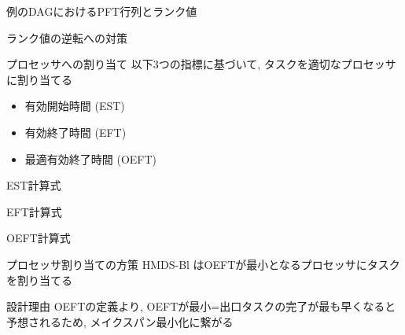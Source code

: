 \begin{frame}{例のDAGにおけるPFT行列とランク値}
\end{frame}

\begin{frame}{ランク値の逆転への対策}
\end{frame}

\begin{frame}{プロセッサへの割り当て}
    以下3つの指標に基づいて, タスクを適切なプロセッサに割り当てる
    \begin{itemize}
        \item 有効開始時間 (EST)
        \item 有効終了時間 (EFT)
        \item 最適有効終了時間 (OEFT)
    \end{itemize}
\end{frame}

\begin{frame}{EST計算式}
\end{frame}

\begin{frame}{EFT計算式}
\end{frame}

\begin{frame}{OEFT計算式}
\end{frame}

\begin{frame}{プロセッサ割り当ての方策}
    HMDS-Bl はOEFTが最小となるプロセッサにタスクを割り当てる
    \begin{block}{設計理由}
        OEFTの定義より, OEFTが最小=出口タスクの完了が最も早くなると予想されるため, メイクスパン最小化に繋がる
    \end{block}
\end{frame}

